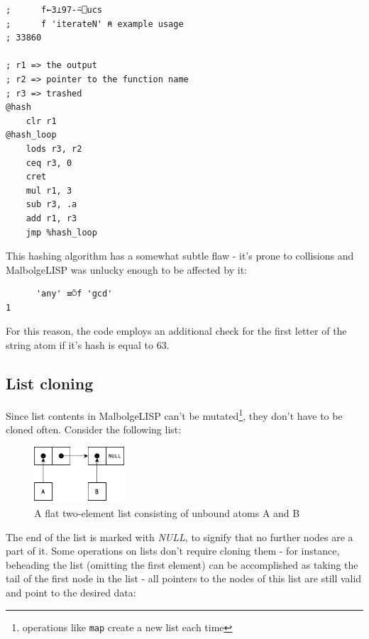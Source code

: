 \begin{verbatim}
;      f←3⊥97-⍨⎕ucs
;      f 'iterateN' ⍝ example usage
; 33860

; r1 => the output
; r2 => pointer to the function name
; r3 => trashed
@hash
    clr r1
@hash_loop
    lods r3, r2
    ceq r3, 0
    cret
    mul r1, 3
    sub r3, .a
    add r1, r3
    jmp %hash_loop
\end{verbatim}

\par This hashing algorithm has a somewhat subtle flaw - it's prone to collisions and MalbolgeLISP was unlucky enough to be affected by it:

\begin{verbatim}
      'any' ≡⍥f 'gcd'
1
\end{verbatim}

\par For this reason, the code employs an additional check for the first letter of the string atom if it's hash is equal to 63.

\subsection{List cloning}

\par Since list contents in MalbolgeLISP can't be mutated\footnote{operations like \verb|map| create a new list each time}, they don't have to be cloned often. Consider the following list:

\begin{figure}[H]
\centering
\includegraphics[width=0.3\textwidth]{figures/plist_1.png}
\caption{A flat two-element list consisting of unbound atoms A and B}
\end{figure}

\par The end of the list is marked with \textit{NULL}, to signify that no further nodes are a part of it. Some operations on lists don't require cloning them - for instance, beheading the list (omitting the first element) can be accomplished as taking the tail of the first node in the list - all pointers to the nodes of this list are still valid and point to the desired data:

